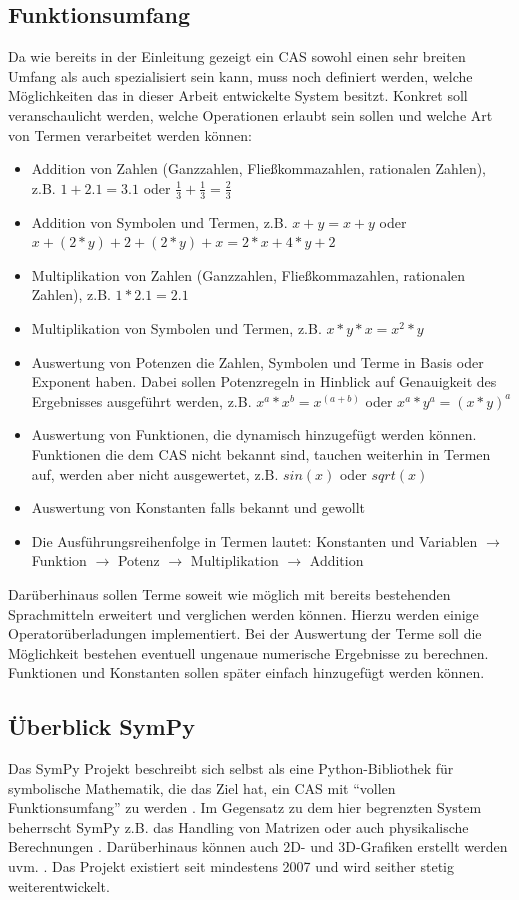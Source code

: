 \documentclass[11pt,a4paper, ngerman]{article}
\begin{document}
\subsection{Funktionsumfang}
Da wie bereits in der Einleitung gezeigt ein CAS sowohl einen sehr breiten Umfang als auch spezialisiert sein kann, muss noch definiert werden, welche Möglichkeiten das in dieser Arbeit entwickelte System besitzt. Konkret soll veranschaulicht werden, welche Operationen erlaubt sein sollen und welche Art von Termen verarbeitet werden können:
\begin{itemize}
    \item Addition von Zahlen (Ganzzahlen, Fließkommazahlen, rationalen Zahlen), z.B. $1+2.1 = 3.1$ oder $\frac{1}{3} + \frac{1}{3} = \frac{2}{3}$
    \item Addition von Symbolen und Termen, z.B. $x+y = x+y$ oder $x+(2*y)+2+(2*y)+x = 2*x+4*y+2$
    \item Multiplikation von Zahlen (Ganzzahlen, Fließkommazahlen, rationalen Zahlen), z.B. $1*2.1 = 2.1$
    \item Multiplikation von Symbolen und Termen, z.B. $x*y*x = x^2*y$
    \item Auswertung von Potenzen die Zahlen, Symbolen und Terme in Basis oder Exponent haben. Dabei sollen Potenzregeln in Hinblick auf Genauigkeit des Ergebnisses ausgeführt werden, z.B. $x^a*x^b=x^{(a+b)}$ oder $x^a*y^a = (x*y)^a$
    \item Auswertung von Funktionen, die dynamisch hinzugefügt werden können. Funktionen die dem CAS nicht bekannt sind, tauchen weiterhin in Termen auf, werden aber nicht ausgewertet, z.B. $sin(x)$ oder $sqrt(x)$
    \item Auswertung von Konstanten falls bekannt und gewollt
    \item Die Ausführungsreihenfolge in Termen lautet: Konstanten und Variablen $\rightarrow$ Funktion $\rightarrow$ Potenz $\rightarrow$ Multiplikation $\rightarrow$ Addition
\end{itemize}

Darüberhinaus sollen Terme soweit wie möglich mit bereits bestehenden Sprachmitteln erweitert und verglichen werden können. Hierzu werden einige Operatorüberladungen implementiert. Bei der Auswertung der Terme soll die Möglichkeit bestehen eventuell ungenaue numerische Ergebnisse zu berechnen. Funktionen und Konstanten sollen später einfach hinzugefügt werden können.

\subsection{Überblick SymPy}
Das SymPy Projekt beschreibt sich selbst als eine Python-Bibliothek für symbolische Mathematik, die das Ziel hat, ein CAS mit ``vollen Funktionsumfang'' zu werden \cite{SymPyAbout}. Im Gegensatz zu dem hier begrenzten System beherrscht SymPy z.B. das Handling von Matrizen \cite[S. 11]{SympyPeerJ} oder auch physikalische Berechnungen \cite[S. 14 ff.]{SympyPeerJ}. Darüberhinaus können auch 2D- und 3D-Grafiken erstellt werden \cite{SymPyPlot} uvm. \cite[S. 4 ff.]{SympyPeerJ}. Das Projekt existiert seit mindestens 2007 \cite{SymPyFirstCommit} und wird seither stetig weiterentwickelt.
\end{document}
